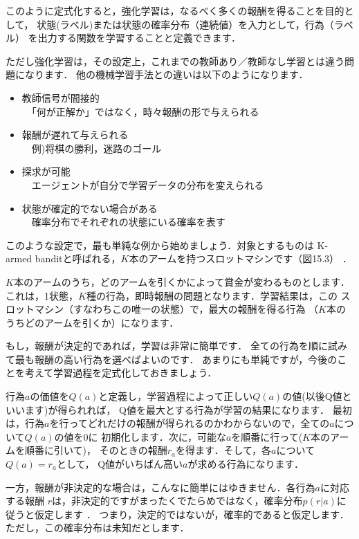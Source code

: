 このように定式化すると，強化学習は，なるべく多くの報酬を得ることを目的として，
状態(ラベル)または状態の確率分布（連続値）を入力として，行為（ラベル）
を出力する関数を学習することと定義できます．

ただし強化学習は，その設定上，これまでの教師あり／教師なし学習とは違う問題になります．
他の機械学習手法との違いは以下のようになります．

\begin{itemize}
\item 教師信号が間接的\\
　「何が正解か」ではなく，時々報酬の形で与えられる
\item 報酬が遅れて与えられる\\
　例)将棋の勝利，迷路のゴール
\item 探求が可能\\
　エージェントが自分で学習データの分布を変えられる
\item 状態が確定的でない場合がある\\
　確率分布でそれぞれの状態にいる確率を表す
\end{itemize}


このような設定で，最も単純な例から始めましょう．対象とするものは
K-armed banditと呼ばれる，$K$本のアームを持つスロットマシンです（図15.3）
．

$K$本のアームのうち，どのアームを引くかによって賞金が変わるものとします．
これは，1状態，$K$種の行為，即時報酬の問題となります．学習結果は，この
スロットマシン（すなわちこの唯一の状態）で，最大の報酬を得る行為
（$K$本のうちどのアームを引くか）になります．

もし，報酬が決定的であれば，学習は非常に簡単です．
全ての行為を順に試みて最も報酬の高い行為を選べばよいのです．
あまりにも単純ですが，今後のことを考えて学習過程を定式化しておきましょう．

行為$a$の価値を$Q(a)$と定義し，学習過程によって正しい$Q(a)$の値(以後Q値といいます)が得られれば，
Q値を最大とする行為が学習の結果になります．
最初は，行為$a$を行ってどれだけの報酬が得られるのかわからないので，全ての$a$について$Q(a)$の値を0に
初期化します．次に，可能な$a$を順番に行って($K$本のアームを順番に引いて)，
そのときの報酬$r_a$を得ます．そして，各$a$について$Q(a)= r_a$として，
Q値がいちばん高い$a$が求める行為になります．


一方，報酬が非決定的な場合は，こんなに簡単にはゆきません．各行為$a$に対応する報酬
$r$は，非決定的ですがまったくでたらめではなく，確率分布$p(r|a)$に従うと仮定します
．
つまり，決定的ではないが，確率的であると仮定します．ただし，この確率分布は未知だとします．

